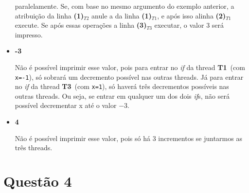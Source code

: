 \documentclass{article}
\newcommand{\Tu}{\textbf{T1}}
\newcommand{\Tt}{\textbf{T3}}
\newcommand{\TL}[2]{\textbf{(#1)}$_{T#2}$}
\begin{document}
\begin{itemize}
		paralelamente. Se, com base no mesmo argumento do exemplo anterior, a atribuição da linha \TL{1}{2} anule a da linha
		\TL{1}{1}, e após isso alinha \TL{2}{1} execute. Se após essas operações a linha \TL{3}{3} executar, o valor 3 será
		impresso.
	\item \textbf{-3}\par
		Não é possível imprimir esse valor, pois para entrar no \emph{if} da thread \Tu\ (com \texttt{x=-1}), só sobrará um
		decremento possível nas outras threads. Já para entrar no \emph{if} da thread \Tt\ (com \texttt{x=1}), só haverá três
		decrementos possíveis nas outras threads. Ou seja, se entrar em qualquer um dos dois \emph{if}s, não será possível
		decrementar x até o valor $-3$.
	\item \textbf{4}\par
		Não é possível imprimir esse valor, pois só há 3 incrementos se juntarmos as três threads.
\end{itemize}

\section*{Questão 4}
\end{document}
